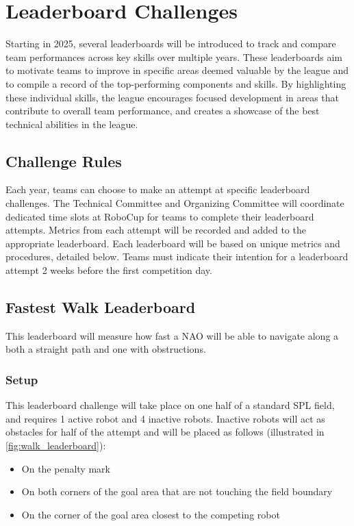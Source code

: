 
\section{Leaderboard Challenges}
Starting in 2025, several leaderboards will be introduced to track and compare team performances across key skills
over multiple years. These leaderboards aim to motivate teams to improve in specific areas deemed valuable by the
league and to compile a record of the top-performing components and skills. By highlighting these individual skills,
the league encourages focused development in areas that contribute to overall team performance, and creates a showcase
of the best technical abilities in the league.

\subsection{Challenge Rules}
Each year, teams can choose to make an attempt at specific leaderboard challenges. The Technical Committee and Organizing
Committee will coordinate dedicated time slots at RoboCup for teams to complete their leaderboard attempts.
Metrics from each attempt will be recorded and added to the appropriate leaderboard. Each leaderboard will be based
on unique metrics and procedures, detailed below. Teams must indicate their intention for a leaderboard attempt 2 weeks before
the first competition day.

\subsection{Fastest Walk Leaderboard}
This leaderboard will measure how fast a NAO will be able to navigate along a both a straight path and one with obstructions.

\subsubsection{Setup}
This leaderboard challenge will take place on one half of a standard SPL field, and requires 1 active robot and 4 inactive robots.
Inactive robots will act as obstacles for half of the attempt and will be placed as follows (illustrated in \cref{fig:walk_leaderboard}):
\begin{itemize}
    \item On the penalty mark
    \item On both corners of the goal area that are not touching the field boundary
    \item On the corner of the goal area closest to the competing robot
\end{itemize}

